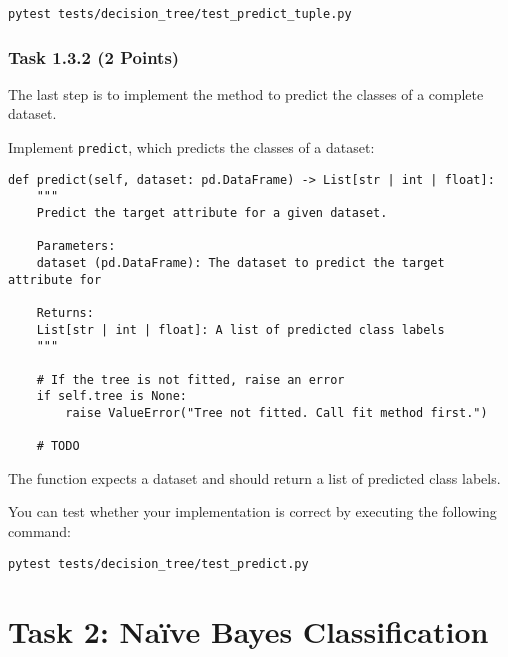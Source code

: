 \documentclass[
english,
smallborders
]{i6prcsht}
\newcommand{\points}[1]{\hfill \color{red}(#1 Points)\color{black}}
\begin{document}
\vspace*{0.3cm}

\begin{lstlisting}
pytest tests/decision_tree/test_predict_tuple.py
\end{lstlisting}

\vspace*{0.1cm}

\subsubsection*{Task 1.3.2 \points{2}}

The last step is to implement the method to predict the classes of a complete dataset.

Implement \texttt{predict}, which predicts the classes of a dataset:

\vspace*{0.3cm}

\begin{lstlisting}
def predict(self, dataset: pd.DataFrame) -> List[str | int | float]:
	"""
	Predict the target attribute for a given dataset.

	Parameters:
	dataset (pd.DataFrame): The dataset to predict the target attribute for

	Returns:
	List[str | int | float]: A list of predicted class labels
	"""

	# If the tree is not fitted, raise an error
	if self.tree is None:
		raise ValueError("Tree not fitted. Call fit method first.")

	# TODO
\end{lstlisting}

\vspace*{0.1cm}

The function expects a dataset and should return a list of predicted class labels.

You can test whether your implementation is correct by executing the following command:

\vspace*{0.3cm}

\begin{lstlisting}
pytest tests/decision_tree/test_predict.py
\end{lstlisting}

\vspace*{0.1cm}


\newpage

\section*{Task 2: Naïve Bayes Classification}
\label{sec:task-two}
\end{document}
